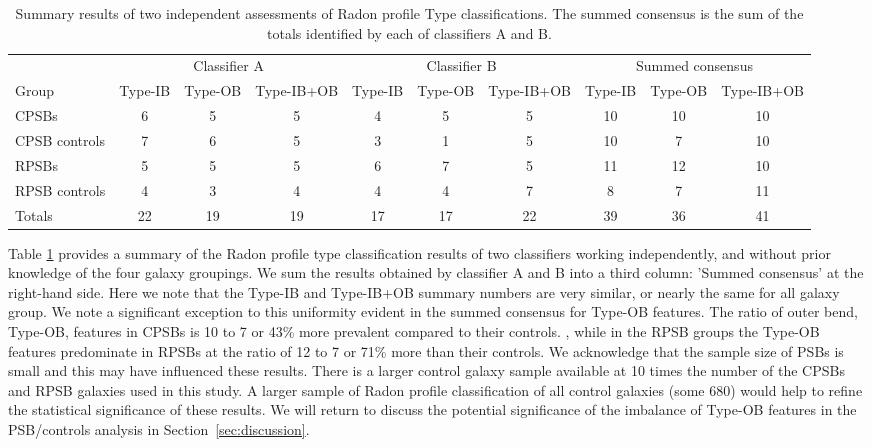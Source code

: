 \begin{table}[]
\caption[Consensus of independent Radon profile classification]{Summary results of two independent assessments of Radon profile Type classifications. The summed consensus is the sum of the totals identified by each of classifiers A and B.}
\label{tab:Radon-VC3-results}
\begin{tabular}{lccccccccc}
\hline
 & \multicolumn{3}{c}{Classifier A} & \multicolumn{3}{c}{Classifier B} & \multicolumn{3}{c}{Summed consensus} \\
Group & Type-IB & Type-OB & Type-IB+OB & \multicolumn{1}{l}{Type-IB} & \multicolumn{1}{l}{Type-OB} & \multicolumn{1}{l}{Type-IB+OB} & Type-IB & Type-OB & Type-IB+OB \\
\hline
CPSBs & 6 & 5 & 5 & 4 & 5 & 5 & 10 & 10 & 10 \\
CPSB controls & 7 & 6 & 5 & 3 & 1 & 5 & 10 & 7 & 10 \\
RPSBs & 5 & 5 & 5 & 6 & 7 & 5 & 11 & 12 & 10 \\
RPSB controls & 4 & 3 & 4 & 4 & 4 & 7 & 8 & 7 & 11 \\
\hline
Totals & 22 & 19 & 19 & 17 & 17 & 22 & 39 & 36 & 41 \\
\hline
\end{tabular}
\end{table}

Table \ref{tab:Radon-VC3-results} provides a summary of the Radon profile type classification results of two classifiers working independently, and without prior knowledge of the four galaxy groupings. We sum the results obtained by classifier A and B into a third column: 'Summed consensus' at the right-hand side. Here we note that the Type-IB and Type-IB+OB summary numbers are very similar, or nearly the same for all galaxy group. We note a significant exception to this uniformity evident in the summed consensus for Type-OB features. The ratio of outer bend, Type-OB, features in CPSBs is 10 to 7 or 43\% more prevalent compared to their controls. , while in the RPSB groups the Type-OB features predominate in RPSBs at the ratio of 12 to 7 or 71\% more than their controls. We acknowledge that the sample size of PSBs is small and this may have influenced these results. There is a larger control galaxy sample available at 10 times the number of the CPSBs and RPSB galaxies used in this study. A larger sample of Radon profile classification of all control galaxies (some 680) would help to refine the statistical significance of these results. We will return to discuss the potential significance of the imbalance of Type-OB features in  the PSB/controls analysis in Section~\ref{sec:discussion}.